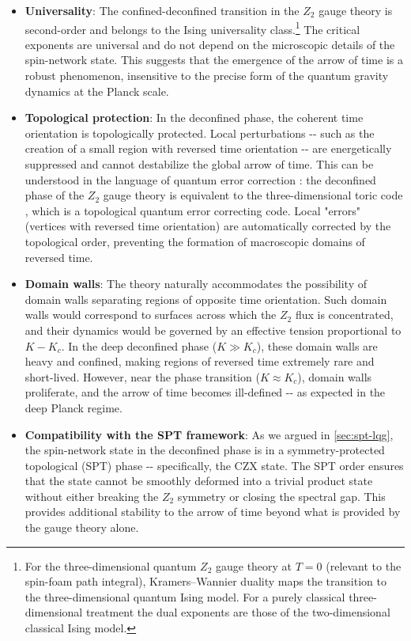\begin{itemize}
\item
  \textbf{Universality}: The confined-deconfined transition in the \(Z_2\) gauge theory is second-order and belongs to the Ising universality class.\footnote{For the three-dimensional quantum $Z_2$ gauge theory at $T=0$ (relevant to the spin-foam path integral), Kramers--Wannier duality maps the transition to the three-dimensional quantum Ising model. For a purely classical three-dimensional treatment the dual exponents are those of the two-dimensional classical Ising model.} The critical exponents are universal and do not depend on the microscopic details of the spin-network state. This suggests that the emergence of the arrow of time is a robust phenomenon, insensitive to the precise form of the quantum gravity dynamics at the Planck scale.
\item
  \textbf{Topological protection}: In the deconfined phase, the coherent time orientation is topologically protected. Local perturbations -\/- such as the creation of a small region with reversed time orientation -\/- are energetically suppressed and cannot destabilize the global arrow of time. This can be understood in the language of quantum error correction \cite{Dennis2002Topological}: the deconfined phase of the \(Z_2\) gauge theory is equivalent to the three-dimensional toric code \cite{Dennis2002Topological}, which is a topological quantum error correcting code. Local "errors" (vertices with reversed time orientation) are automatically corrected by the topological order, preventing the formation of macroscopic domains of reversed time.
\item
  \textbf{Domain walls}: The theory naturally accommodates the possibility of domain walls separating regions of opposite time orientation. Such domain walls would correspond to surfaces across which the \(Z_2\) flux is concentrated, and their dynamics would be governed by an effective tension proportional to \(K - K_c\). In the deep deconfined phase (\(K \gg K_c\)), these domain walls are heavy and confined, making regions of reversed time extremely rare and short-lived. However, near the phase transition (\(K \approx K_c\)), domain walls proliferate, and the arrow of time becomes ill-defined -\/- as expected in the deep Planck regime.
\item
  \textbf{Compatibility with the SPT framework}: As we argued in \autoref{sec:spt-lqg}, the spin-network state in the deconfined phase is in a symmetry-protected topological (SPT) phase -\/- specifically, the CZX state. The SPT order ensures that the state cannot be smoothly deformed into a trivial product state without either breaking the \(Z_2\) symmetry or closing the spectral gap. This provides additional stability to the arrow of time beyond what is provided by the gauge theory alone.
\end{itemize}


